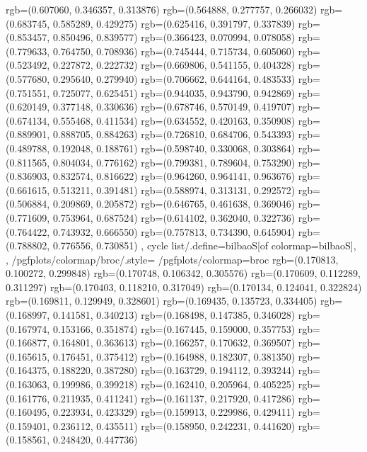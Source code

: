 {{{					rgb=(0.607060, 0.346357, 0.313876)
					rgb=(0.564888, 0.277757, 0.266032)
					rgb=(0.683745, 0.585289, 0.429275)
					rgb=(0.625416, 0.391797, 0.337839)
					rgb=(0.853457, 0.850496, 0.839577)
					rgb=(0.366423, 0.070994, 0.078058)
					rgb=(0.779633, 0.764750, 0.708936)
					rgb=(0.745444, 0.715734, 0.605060)
					rgb=(0.523492, 0.227872, 0.222732)
					rgb=(0.669806, 0.541155, 0.404328)
					rgb=(0.577680, 0.295640, 0.279940)
					rgb=(0.706662, 0.644164, 0.483533)
					rgb=(0.751551, 0.725077, 0.625451)
					rgb=(0.944035, 0.943790, 0.942869)
					rgb=(0.620149, 0.377148, 0.330636)
					rgb=(0.678746, 0.570149, 0.419707)
					rgb=(0.674134, 0.555468, 0.411534)
					rgb=(0.634552, 0.420163, 0.350908)
					rgb=(0.889901, 0.888705, 0.884263)
					rgb=(0.726810, 0.684706, 0.543393)
					rgb=(0.489788, 0.192048, 0.188761)
					rgb=(0.598740, 0.330068, 0.303864)
					rgb=(0.811565, 0.804034, 0.776162)
					rgb=(0.799381, 0.789604, 0.753290)
					rgb=(0.836903, 0.832574, 0.816622)
					rgb=(0.964260, 0.964141, 0.963676)
					rgb=(0.661615, 0.513211, 0.391481)
					rgb=(0.588974, 0.313131, 0.292572)
					rgb=(0.506884, 0.209869, 0.205872)
					rgb=(0.646765, 0.461638, 0.369046)
					rgb=(0.771609, 0.753964, 0.687524)
					rgb=(0.614102, 0.362040, 0.322736)
					rgb=(0.764422, 0.743932, 0.666550)
					rgb=(0.757813, 0.734390, 0.645904)
					rgb=(0.788802, 0.776556, 0.730851)
			},
		cycle list/.define={bilbaoS}{[of colormap=bilbaoS]},
		},
		/pgfplots/colormap/broc/.style={
			/pgfplots/colormap={broc}{%
					rgb=(0.170813, 0.100272, 0.299848)
					rgb=(0.170748, 0.106342, 0.305576)
					rgb=(0.170609, 0.112289, 0.311297)
					rgb=(0.170403, 0.118210, 0.317049)
					rgb=(0.170134, 0.124041, 0.322824)
					rgb=(0.169811, 0.129949, 0.328601)
					rgb=(0.169435, 0.135723, 0.334405)
					rgb=(0.168997, 0.141581, 0.340213)
					rgb=(0.168498, 0.147385, 0.346028)
					rgb=(0.167974, 0.153166, 0.351874)
					rgb=(0.167445, 0.159000, 0.357753)
					rgb=(0.166877, 0.164801, 0.363613)
					rgb=(0.166257, 0.170632, 0.369507)
					rgb=(0.165615, 0.176451, 0.375412)
					rgb=(0.164988, 0.182307, 0.381350)
					rgb=(0.164375, 0.188220, 0.387280)
					rgb=(0.163729, 0.194112, 0.393244)
					rgb=(0.163063, 0.199986, 0.399218)
					rgb=(0.162410, 0.205964, 0.405225)
					rgb=(0.161776, 0.211935, 0.411241)
					rgb=(0.161137, 0.217920, 0.417286)
					rgb=(0.160495, 0.223934, 0.423329)
					rgb=(0.159913, 0.229986, 0.429411)
					rgb=(0.159401, 0.236112, 0.435511)
					rgb=(0.158950, 0.242231, 0.441620)
					rgb=(0.158561, 0.248420, 0.447736)
}}}
